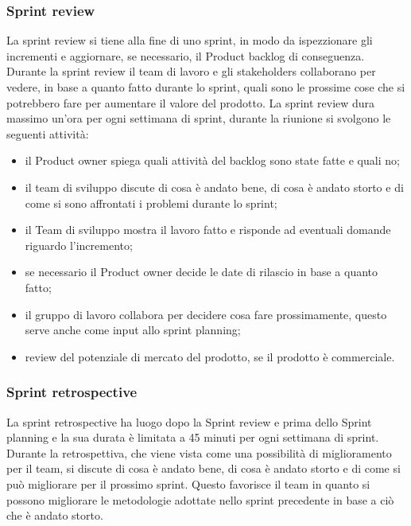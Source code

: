 \subsubsection{Sprint review}
La sprint review si tiene alla fine di uno sprint, in modo da ispezzionare gli incrementi e aggiornare, se necessario, il Product backlog di conseguenza. Durante la sprint review il team di lavoro e gli stakeholders collaborano per vedere, in base a quanto fatto durante lo sprint, quali sono le prossime cose che si potrebbero fare per aumentare il valore del prodotto. La sprint review dura massimo un'ora per ogni settimana di sprint, durante la riunione si svolgono le seguenti attività:
\begin{itemize}
    \item il Product owner spiega quali attività del backlog sono state fatte e quali no;
    \item il team di sviluppo discute di cosa è andato bene, di cosa è andato storto e di come si sono affrontati i problemi durante lo sprint;
    \item il Team di sviluppo mostra il lavoro fatto e risponde ad eventuali domande riguardo l'incremento;
    \item se necessario il Product owner decide le date di rilascio in base a quanto fatto;
    \item il gruppo di lavoro collabora per decidere cosa fare prossimamente, questo serve anche come input allo sprint planning;
    \item review del potenziale di mercato del prodotto, se il prodotto è commerciale.
\end{itemize}

\subsubsection{Sprint retrospective}
La sprint retrospective ha luogo dopo la Sprint review e prima dello Sprint planning e la sua durata è limitata a 45 minuti per ogni settimana di sprint. Durante la retrospettiva, che viene vista come una possibilità di miglioramento per il team, si discute di cosa è andato bene, di cosa è andato storto e di come si può migliorare per il prossimo sprint. Questo favorisce il team in quanto si possono migliorare le metodologie adottate nello sprint precedente in base a ciò che è andato storto.
